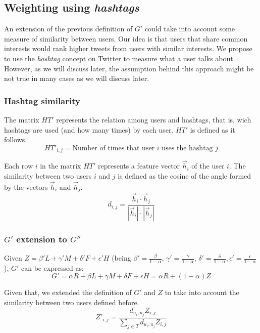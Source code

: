 \subsection{Weighting using \emph{hashtags}}
An extension of the previous definition of $G'$ could take into account some measure of similarity between users. Our idea is that users that share common interests would rank higher tweets from users with similar interests. We propose to use the \emph{hashtag} concept on Twitter to measure what a user talks about. However, as we will discuss later, the assumption behind this approach might be not true in many cases as we will discuss later.

\subsubsection*{Hashtag similarity}
The matrix $HT'$ represents the relation among users and hashtags, that is, wich hashtags are used (and how many times) by each user. $HT'$ is defined as it follows.
\begin{equation}
HT'_{i,j} = \text{Number of times that user } i \text{ uses the hashtag } j
\end{equation}

Each row $i$ in the matrix $HT'$ represents a feature vector $\vec{h}_i$ of the user $i$. The similarity between two users $i$ and $j$ is defined as the cosine of the angle formed by the vectors $\vec{h}_i$ and $\vec{h}_j$.
\begin{equation}
d_{i,j} = \frac{\vec{h}_i \cdot \vec{h}_j}{ |\vec{h}_i| \cdot |\vec{h}_j|}
\end{equation}

\subsubsection*{$G'$ extension to $G''$}
Given $Z = \beta' L + \gamma' M + \delta' F + \epsilon' H$ (being $\beta' = \frac{\beta}{1-\alpha}$, $\gamma' = \frac{\gamma}{1-\alpha}$, $\delta' = \frac{\delta}{1-\alpha}, \epsilon' = \frac{\epsilon}{1 - \alpha}$),  $G'$ can be expressed as:
\begin{equation}
G' = \alpha R + \beta L + \gamma M + \delta F + \epsilon H =  \alpha R + (1-\alpha) Z
\end{equation}

Given that, we extended the definition of $G'$ and $Z$ to take into account the similarity between two users defined before. 
\begin{equation}
Z'_{i,j} = \frac{d_{u_i,u_j} Z_{i,j}}{\sum_{j \in T}{d_{u_i,u_j} Z_{i,j}}}
\end{equation}

